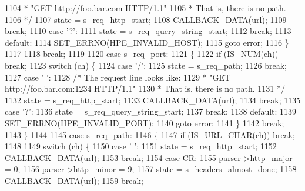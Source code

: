 \begin{DoxyCode}
1104 \textcolor{comment}{             *   "GET http://foo.bar.com HTTP/1.1"}
1105 \textcolor{comment}{             * That is, there is no path.}
1106 \textcolor{comment}{             */}
1107             state = s_req_http_start;
1108             CALLBACK_DATA(url);
1109             \textcolor{keywordflow}{break};
1110           \textcolor{keywordflow}{case} \textcolor{charliteral}{'?'}:
1111             state = s_req_query_string_start;
1112             \textcolor{keywordflow}{break};
1113           \textcolor{keywordflow}{default}:
1114             SET_ERRNO(HPE_INVALID_HOST);
1115             \textcolor{keywordflow}{goto} error;
1116         \}
1117 
1118         \textcolor{keywordflow}{break};
1119 
1120       \textcolor{keywordflow}{case} s_req_port:
1121       \{
1122         \textcolor{keywordflow}{if} (IS_NUM(ch)) \textcolor{keywordflow}{break};
1123         \textcolor{keywordflow}{switch} (ch) \{
1124           \textcolor{keywordflow}{case} \textcolor{charliteral}{'/'}:
1125             state = s_req_path;
1126             \textcolor{keywordflow}{break};
1127           \textcolor{keywordflow}{case} \textcolor{charliteral}{' '}:
1128             \textcolor{comment}{/* The request line looks like:}
1129 \textcolor{comment}{             *   "GET http://foo.bar.com:1234 HTTP/1.1"}
1130 \textcolor{comment}{             * That is, there is no path.}
1131 \textcolor{comment}{             */}
1132             state = s_req_http_start;
1133             CALLBACK_DATA(url);
1134             \textcolor{keywordflow}{break};
1135           \textcolor{keywordflow}{case} \textcolor{charliteral}{'?'}:
1136             state = s_req_query_string_start;
1137             \textcolor{keywordflow}{break};
1138           \textcolor{keywordflow}{default}:
1139             SET_ERRNO(HPE_INVALID_PORT);
1140             \textcolor{keywordflow}{goto} error;
1141         \}
1142         \textcolor{keywordflow}{break};
1143       \}
1144 
1145       \textcolor{keywordflow}{case} s_req_path:
1146       \{
1147         \textcolor{keywordflow}{if} (IS_URL_CHAR(ch)) \textcolor{keywordflow}{break};
1148 
1149         \textcolor{keywordflow}{switch} (ch) \{
1150           \textcolor{keywordflow}{case} \textcolor{charliteral}{' '}:
1151             state = s_req_http_start;
1152             CALLBACK_DATA(url);
1153             \textcolor{keywordflow}{break};
1154           \textcolor{keywordflow}{case} CR:
1155             parser->http_major = 0;
1156             parser->http_minor = 9;
1157             state = s_headers_almost_done;
1158             CALLBACK_DATA(url);
1159             \textcolor{keywordflow}{break};

\end{DoxyCode}
